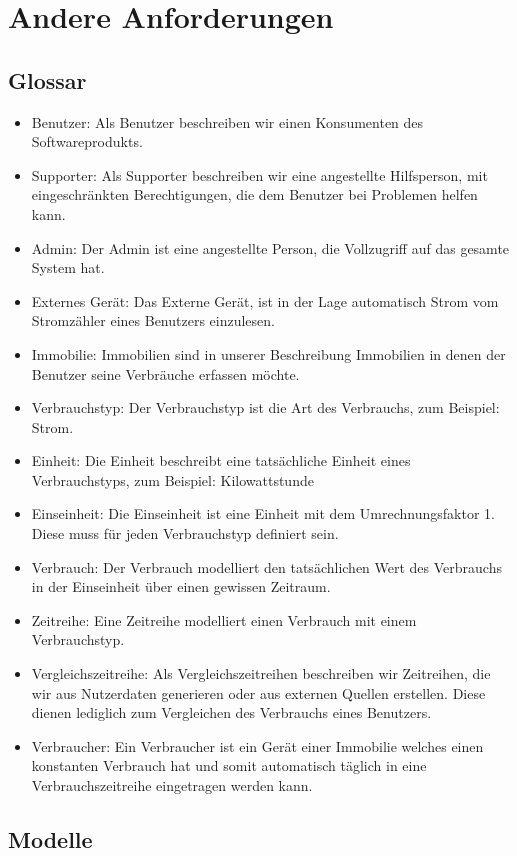 \section{Andere Anforderungen}
\subsection{Glossar}
\begin{itemize}
\item Benutzer: Als Benutzer beschreiben wir einen Konsumenten des Softwareprodukts.
\item Supporter: Als Supporter beschreiben wir eine angestellte Hilfsperson, mit eingeschränkten Berechtigungen, die dem Benutzer bei Problemen helfen kann.
\item Admin: Der Admin ist eine angestellte Person, die Vollzugriff auf das gesamte System hat.
\item Externes Gerät: Das Externe Gerät, ist in der Lage automatisch Strom vom Stromzähler eines Benutzers einzulesen.
\item Immobilie: Immobilien sind in unserer Beschreibung Immobilien in denen der Benutzer seine Verbräuche erfassen möchte.
\item Verbrauchstyp: Der Verbrauchstyp ist die Art des Verbrauchs, zum Beispiel: Strom.
\item Einheit: Die Einheit beschreibt eine tatsächliche Einheit eines Verbrauchstyps, zum Beispiel: Kilowattstunde
\item Einseinheit: Die Einseinheit ist eine Einheit mit dem Umrechnungsfaktor 1. Diese muss für jeden Verbrauchstyp definiert sein.
\item Verbrauch: Der Verbrauch modelliert den tatsächlichen Wert des Verbrauchs in der Einseinheit über einen gewissen Zeitraum.
\item Zeitreihe: Eine Zeitreihe modelliert einen Verbrauch mit einem Verbrauchstyp.
\item Vergleichszeitreihe: Als Vergleichszeitreihen beschreiben wir Zeitreihen, die wir aus Nutzerdaten generieren oder aus externen Quellen erstellen. Diese dienen lediglich zum Vergleichen des Verbrauchs eines Benutzers.
\item Verbraucher: Ein Verbraucher ist ein Gerät einer Immobilie welches einen konstanten Verbrauch hat und somit automatisch täglich in eine Verbrauchszeitreihe eingetragen werden kann.
\end{itemize}
\subsection{Modelle}